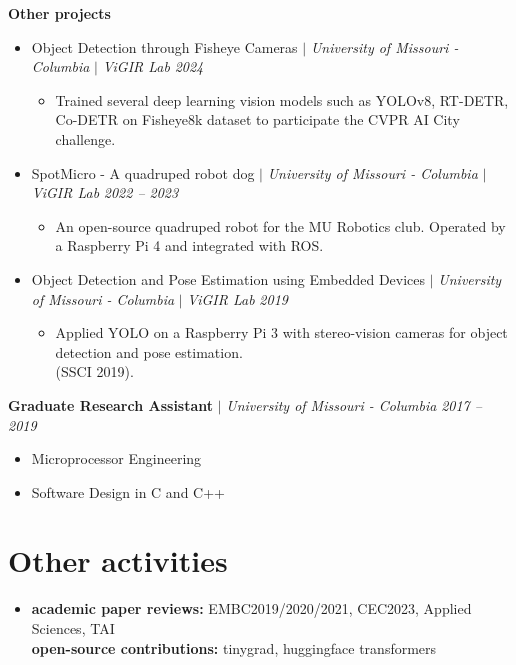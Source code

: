 \documentclass[letterpaper,10pt]{article}
\begin{document}
\textbf{Other projects}
\begin{itemize}[leftmargin=0.15in, parsep=0pt] 
  \item Object Detection through Fisheye Cameras $|$
  \emph{University of Missouri - Columbia} $|$ 
  \emph{ViGIR Lab}
  \hfill\textit{2024}
  \begin{itemize}[leftmargin=0.15in, parsep=0pt]
    \item Trained several deep learning vision models such as YOLOv8, RT-DETR, Co-DETR on Fisheye8k dataset to participate the CVPR AI City challenge.
  \end{itemize}

  \item SpotMicro - A quadruped robot dog $|$
  \emph{University of Missouri - Columbia} $|$
  \emph{ViGIR Lab}
  \hfill\textit{2022 -- 2023}
  \begin{itemize}[leftmargin=0.15in, parsep=0pt]
    \item An open-source quadruped robot for the MU Robotics club. Operated by a Raspberry Pi 4 and integrated with ROS.
  \end{itemize}

  \item Object Detection and Pose Estimation using Embedded Devices $|$
   \emph{University of Missouri - Columbia} $|$ 
  \emph{ViGIR Lab}
  \hfill\textit{2019}
  \begin{itemize}[leftmargin=0.15in, parsep=0pt]
    \item Applied YOLO on a Raspberry Pi 3 with stereo-vision cameras for object detection and pose estimation.\\ (SSCI 2019).
  \end{itemize}
\end{itemize}

\textbf{Graduate Research Assistant} $|$
\emph{University of Missouri - Columbia} \hfill
\emph{2017 -- 2019}
\begin{itemize}[leftmargin=0.15in, parsep=0pt] 
  \item Microprocessor Engineering
  \item Software Design in C and C++
\end{itemize}

\nocite{*}
\printbibliography[title={Publications}]

\section{Other activities}
\begin{itemize}[leftmargin=0.15in, label={}]
  \item{
  \textbf{academic paper reviews: }{EMBC2019/2020/2021, CEC2023, Applied Sciences, TAI} \\
  \textbf{open-source contributions: }{tinygrad, huggingface transformers} \\
  }
\end{itemize}
\end{document}
